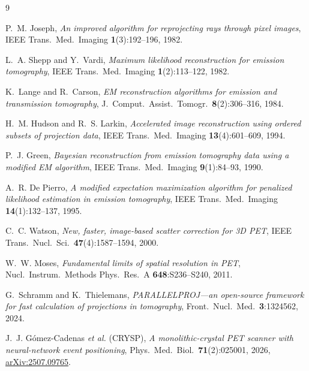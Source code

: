 \begin{thebibliography}{9}

P.~M. Joseph,
\emph{An improved algorithm for reprojecting rays through pixel images},
IEEE Trans.\ Med.\ Imaging \textbf{1}(3):192--196, 1982.

L.~A. Shepp and Y.~Vardi,
\emph{Maximum likelihood reconstruction for emission tomography},
IEEE Trans.\ Med.\ Imaging \textbf{1}(2):113--122, 1982.

K.~Lange and R.~Carson,
\emph{EM reconstruction algorithms for emission and transmission tomography},
J.\ Comput.\ Assist.\ Tomogr.\ \textbf{8}(2):306--316, 1984.

H.~M. Hudson and R.~S. Larkin,
\emph{Accelerated image reconstruction using ordered subsets of projection
data},
IEEE Trans.\ Med.\ Imaging \textbf{13}(4):601--609, 1994.

P.~J. Green,
\emph{Bayesian reconstruction from emission tomography data using a modified EM
algorithm},
IEEE Trans.\ Med.\ Imaging \textbf{9}(1):84--93, 1990.

A.~R. De Pierro,
\emph{A modified expectation maximization algorithm for penalized likelihood
estimation in emission tomography},
IEEE Trans.\ Med.\ Imaging \textbf{14}(1):132--137, 1995.

C.~C. Watson,
\emph{New, faster, image-based scatter correction for 3D PET},
IEEE Trans.\ Nucl.\ Sci.\ \textbf{47}(4):1587--1594, 2000.

W.~W. Moses,
\emph{Fundamental limits of spatial resolution in PET},
Nucl.\ Instrum.\ Methods Phys.\ Res.\ A \textbf{648}:S236--S240, 2011.

G.~Schramm and K.~Thielemans,
\emph{PARALLELPROJ---an open-source framework for fast calculation of
projections in tomography},
Front.\ Nucl.\ Med.\ \textbf{3}:1324562, 2024.

J.~J. G\'omez-Cadenas \emph{et al.} (CRYSP),
\emph{A monolithic-crystal PET scanner with neural-network event positioning},
Phys.\ Med.\ Biol.\ \textbf{71}(2):025001, 2026,
\href{https://arxiv.org/abs/2507.09765}{arXiv:2507.09765}.

\end{thebibliography}
